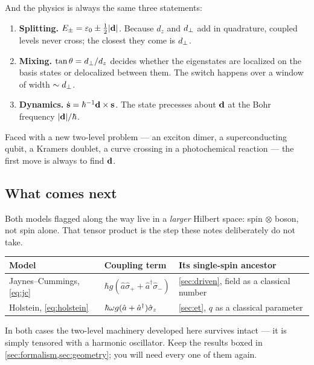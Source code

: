 \noindent
And the physics is always the same three statements:

\begin{enumerate}[leftmargin=*,itemsep=3pt]
\item \textbf{Splitting.} $E_\pm = \varepsilon_0 \pm \tfrac{1}{2}|\mathbf{d}|$. Because $d_z$ and
$d_{\perp}$ add in quadrature, coupled levels never cross; the closest they come is
$d_{\perp}$.
\item \textbf{Mixing.} $\tan\theta = d_{\perp}/d_z$ decides whether the eigenstates are
localized on the basis states or delocalized between them. The switch happens over a
window of width $\sim d_{\perp}$.
\item \textbf{Dynamics.} $\dot{\mathbf{s}} = \hbar^{-1}\mathbf{d}\times\mathbf{s}$. The state precesses
about $\mathbf{d}$ at the Bohr frequency $|\mathbf{d}|/\hbar$.
\end{enumerate}

\noindent
Faced with a new two-level problem --- an exciton dimer, a superconducting qubit, a
Kramers doublet, a curve crossing in a photochemical reaction --- the first move is
always to find $\mathbf{d}$.

\subsection*{What comes next}

Both models flagged along the way live in a \emph{larger} Hilbert space: spin
$\otimes$ boson, not spin alone. That tensor product is the step these notes deliberately
do not take.

\begin{center}
\small
\begin{tabular}{@{}lll@{}}
\toprule
Model & Coupling term & Its single-spin ancestor \\
\midrule
Jaynes--Cummings, \cref{eq:jc}
  & $\hbar g(\hat{a}\hat\sigma_+ + \hat{a}^\dagger\hat\sigma_-)$
  & \cref{sec:driven}, field as a classical number \\
Holstein, \cref{eq:holstein}
  & $\hbar\omega g(\hat{a}+\hat{a}^\dagger)\hat{\sigma}_z$
  & \cref{sec:et}, $q$ as a classical parameter \\
\bottomrule
\end{tabular}
\end{center}

\noindent
In both cases the two-level machinery developed here survives intact --- it is simply
tensored with a harmonic oscillator. Keep the results boxed in
\cref{sec:formalism,sec:geometry}; you will need every one of them again.
